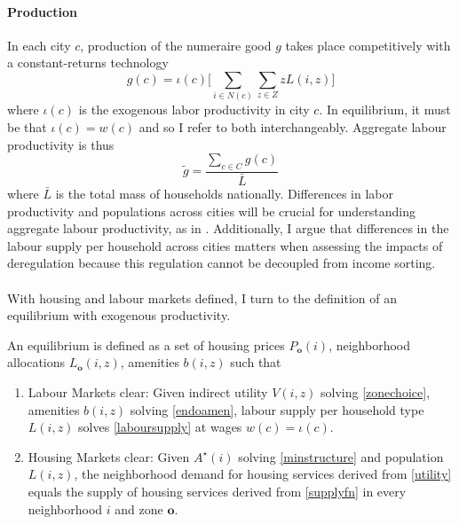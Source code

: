 \documentclass[12pt]{article}
\begin{document}
	
	
	\paragraph*{Production} In each city $c$, production of the numeraire good $g$ takes place competitively with a constant-returns technology
	\begin{equation}\label{production}
		g(c) = \iota(c)\bigg[\sum_{i \in N(c)}\sum_{z \in Z}zL(i, z)\bigg]
	\end{equation}
	where $\iota(c)$ is the exogenous labor productivity in city $c$. In equilibrium, it must be that $\iota(c) = w(c)$ and so I 	refer to both interchangeably. Aggregate labour productivity is thus 
	\begin{equation}\label{eq:aggregateProd}
		\tilde{g} = \frac{\sum_{c \in C}g(c)}{\bar{L}}
	\end{equation}
	 where $\bar{L}$ is the total mass of households nationally. Differences in labor productivity and populations across cities will be crucial for understanding aggregate labour productivity, as in \cite{hseihmoretti}. Additionally, I argue that differences in the labour supply per household across cities matters when assessing the impacts of deregulation because this regulation cannot be decoupled from income sorting.
	 
	\paragraph*{}
	With housing and labour markets defined, I turn to the definition of an equilibrium with exogenous productivity.
	
	\begin{Definition}
	 An equilibrium is defined as a set of housing prices $P_{\boldsymbol{o}}(i)$, neighborhood allocations $L_{\boldsymbol{o}}(i, z)$, amenities $b(i, z)$ such that
	 
	\begin{enumerate}
		\item Labour Markets clear: Given indirect utility $V(i, z)$ solving \eqref{zonechoice}, amenities $b(i, z)$ solving \eqref{endoamen}, labour supply per household type $L(i, z)$ solves \eqref{laboursupply} at wages $w(c) = \iota(c)$.
	
		\item Housing Markets clear: Given $A^{\star}(i)$ solving \eqref{minstructure} and population $L(i, z)$, the neighborhood demand for housing services derived from \eqref{utility} equals the supply of housing services derived from \eqref{supplyfn} in every neighborhood $i$ and zone $\boldsymbol{o}$. 
	\end{enumerate}
	
	\end{Definition}
\end{document}
